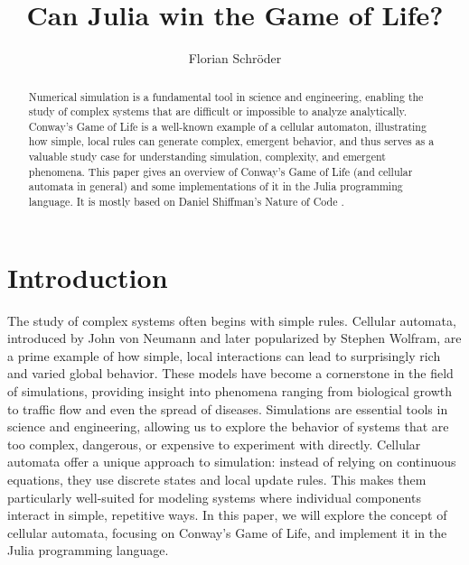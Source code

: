 \documentclass[a4paper,12pt]{llncs}
\numberwithin{equation}{section}
\begin{document}

%
\author{Florian Schröder}
%
\title{Can Julia win the Game of Life?}
%
%
\maketitle              %
\thispagestyle{empty}
%
%
\begin{abstract}
  Numerical simulation is a fundamental tool in science and engineering, enabling the study of complex systems that are difficult or impossible to analyze analytically.
  Conway's Game of Life is a well-known example of a cellular automaton, illustrating how simple, local rules can generate complex, emergent behavior, and thus serves as a valuable study case for understanding simulation, complexity, and emergent phenomena.
  This paper gives an overview of Conway's Game of Life (and cellular automata in general) and some implementations of it in the Julia programming language.
  It is mostly based on Daniel Shiffman's Nature of Code \cite{NOC}.
\end{abstract}


\section{Introduction}
The study of complex systems often begins with simple rules.
Cellular automata, introduced by John von Neumann and later popularized by Stephen Wolfram, are a prime example of how simple, local interactions can lead to surprisingly rich and varied global behavior.
These models have become a cornerstone in the field of simulations, providing insight into phenomena ranging from biological growth to traffic flow and even the spread of diseases.
Simulations are essential tools in science and engineering, allowing us to explore the behavior of systems that are too complex, dangerous, or expensive to experiment with directly.
Cellular automata offer a unique approach to simulation: instead of relying on continuous equations, they use discrete states and local update rules.
This makes them particularly well-suited for modeling systems where individual components interact in simple, repetitive ways.
In this paper, we will explore the concept of cellular automata, focusing on Conway's Game of Life, and implement it in the Julia programming language.
\end{document}
